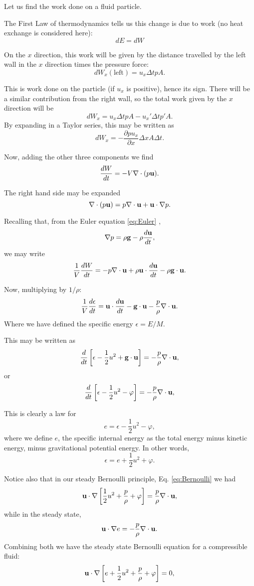 Let us find the work done on a fluid particle.

The First Law of thermodynamics tells us this change is due
to work (no heat exchange is considered here):
\[
dE=dW
\]

On the $x$ direction, this work will be given by the distance
travelled by the left wall in the $x$ direction times the pressure
force:
\[
dW_x (\mathrm{left})  = u_x \Delta t p A .
\]

This is work done on the particle (if $u_x$ is positive), hence its
sign. There will be a similar contribution from the right wall, so the
total work given by the $x$ direction will be
\[
dW_x = u_x \Delta t p A  -  u_x'  \Delta t p' A .
\]
By expanding in a Taylor series, this may be written as
\[
dW_x = - \frac{\partial p u_x}{\partial x} \Delta x A \Delta t.
\]

Now, adding the other three components we find
\[
\frac{dW}{dt} = - V \nabla\cdot (p\mathbf{u}) .
\]

The right hand side may be expanded
\[
\nabla\cdot (p\mathbf{u}) =
 p \nabla\cdot \mathbf{u} + 
 \mathbf{u} \cdot \nabla p .
\]

Recalling that, from the Euler equation \ref{eq:Euler} ,
\[
\nabla p  = \rho \mathbf{g} - \rho \frac{d \mathbf{u}}{dt} ,
\]
we may write
\[
\frac{1}{V} \frac{dW}{dt} =
-  p \nabla\cdot \mathbf{u} +
\rho  \mathbf{u} \cdot \frac{d \mathbf{u}}{dt}  -
\rho  \mathbf{g} \cdot  \mathbf{u} .
\]

Now, multiplying by $1/\rho$:
\[
\frac{1}{V} \frac{d \epsilon }{dt} =
 \mathbf{u} \cdot \frac{d \mathbf{u}}{dt}  -
 \mathbf{g} \cdot  \mathbf{u} 
-  \frac{p}{\rho} \nabla\cdot \mathbf{u} .
\]
Where we have defined the specific energy $\epsilon=E/M$.

This may be written as
\[
\frac{d}{dt} \left[
  \epsilon - \frac12 u^2  + \mathbf{g} \cdot \mathbf{u}
  \right] = -  \frac{p}{\rho} \nabla\cdot \mathbf{u} ,
\]
or
\[
\frac{d}{dt} \left[
  \epsilon - \frac12 u^2  - \varphi
  \right] = -  \frac{p}{\rho} \nabla\cdot \mathbf{u} ,
\]

This is clearly a law for
\[
e = \epsilon - \frac12 u^2  - \varphi ,
\]
where we define $e$, the specific internal energy as the total energy
minus kinetic energy, minus gravitational potential energy. In other words,
\[
\epsilon  = e  + \frac12 u^2  + \varphi .
\]

Notice also that in our steady Bernoulli principle,
Eq. \ref{eq:Bernoulli} we had
\[
\mathbf{u} \cdot
\nabla \left[
  \frac12 u^2 + \frac{p}{\rho} + \varphi
  \right] =  \frac{p}{\rho} \nabla \cdot \mathbf{u} ,
\]
while in the steady state,
\[
\mathbf{u} \cdot \nabla e = -  \frac{p}{\rho} \nabla\cdot \mathbf{u}.
\]
Combining both we have the steady state Bernoulli equation for
a compressible fluid:
\[
\mathbf{u} \cdot \nabla \left[ e + \frac12 u^2 + \frac{p}{\rho} + \varphi
  \right] = 0 ,
\]

